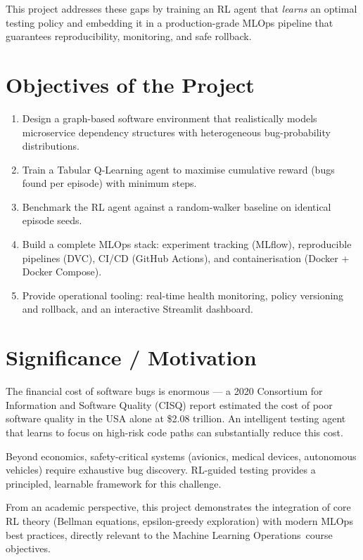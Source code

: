 \documentclass[12pt,a4paper]{report}
\newcommand{\coursename}{Machine Learning Operations}
\begin{document}
This project addresses these gaps by training an RL agent that
\emph{learns} an optimal testing policy and embedding it in a
production-grade MLOps pipeline that guarantees reproducibility,
monitoring, and safe rollback.

\section{Objectives of the Project}

\begin{enumerate}[leftmargin=1.5em]
  \item Design a graph-based software environment that realistically
        models microservice dependency structures with heterogeneous
        bug-probability distributions.
  \item Train a Tabular Q-Learning agent to maximise cumulative reward
        (bugs found per episode) with minimum steps.
  \item Benchmark the RL agent against a random-walker baseline on
        identical episode seeds.
  \item Build a complete MLOps stack: experiment tracking (MLflow),
        reproducible pipelines (DVC), CI/CD (GitHub Actions), and
        containerisation (Docker + Docker Compose).
  \item Provide operational tooling: real-time health monitoring,
        policy versioning and rollback, and an interactive Streamlit
        dashboard.
\end{enumerate}

\section{Significance / Motivation}

The financial cost of software bugs is enormous --- a 2020 Consortium
for Information and Software Quality (CISQ) report estimated the cost of
poor software quality in the USA alone at \$2.08 trillion.  An
intelligent testing agent that learns to focus on high-risk code paths
can substantially reduce this cost.

Beyond economics, safety-critical systems (avionics, medical devices,
autonomous vehicles) require exhaustive bug discovery.  RL-guided testing
provides a principled, learnable framework for this challenge.

From an academic perspective, this project demonstrates the integration
of core RL theory (Bellman equations, epsilon-greedy exploration) with
modern MLOps best practices, directly relevant to the
\coursename\ course objectives.
\end{document}
